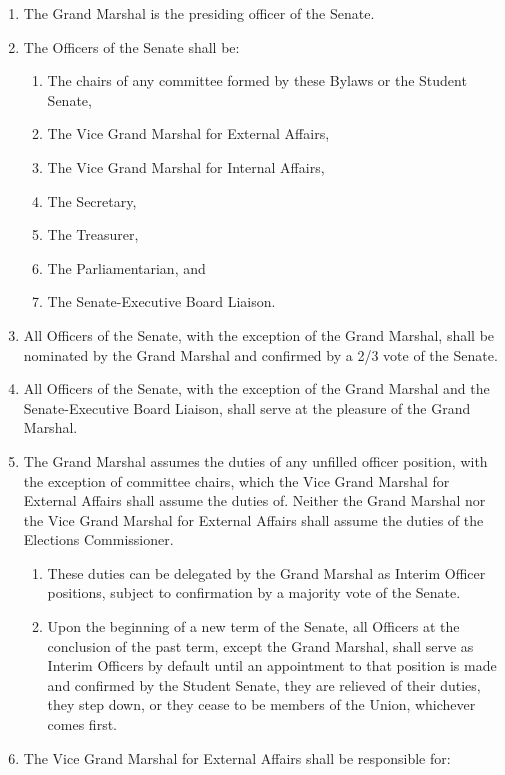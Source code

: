 \documentclass{uniondoc}
\begin{document}
\begin{enumerate}
	\item The Grand Marshal is the presiding officer of the Senate.
	\item The Officers of the Senate shall be:
	      \begin{enumerate}
		      \item The chairs of any committee formed by these Bylaws or the Student Senate,
		      \item The Vice Grand Marshal for External Affairs,
		      \item The Vice Grand Marshal for Internal Affairs,
		      \item The Secretary,
		      \item The Treasurer,
		      \item The Parliamentarian, and
		      \item The Senate-Executive Board Liaison.
	      \end{enumerate}
	\item All Officers of the Senate, with the exception of the Grand Marshal, shall be nominated by the Grand Marshal and confirmed by a 2/3 vote of the Senate.
	\item All Officers of the Senate, with the exception of the Grand Marshal and the Senate-Executive Board Liaison, shall serve at the pleasure of the Grand Marshal.
	\item The Grand Marshal assumes the duties of any unfilled officer position, with the exception of committee chairs, which the Vice Grand Marshal for External Affairs shall assume the duties of.
	      Neither the Grand Marshal nor the Vice Grand Marshal for External Affairs shall assume the duties of the Elections Commissioner.
	      \begin{enumerate}
		      \item These duties can be delegated by the Grand Marshal as Interim Officer positions, subject to confirmation by a majority vote of the Senate.
		      \item Upon the beginning of a new term of the Senate, all Officers at the conclusion of the past term, except the Grand Marshal, shall serve as Interim Officers by default until an appointment to that position is made and confirmed by the Student Senate, they are relieved of their duties, they step down, or they cease to be members of the Union, whichever comes first.
	      \end{enumerate}
	\item The Vice Grand Marshal for External Affairs shall be responsible for:

\end{enumerate}
\end{document}
